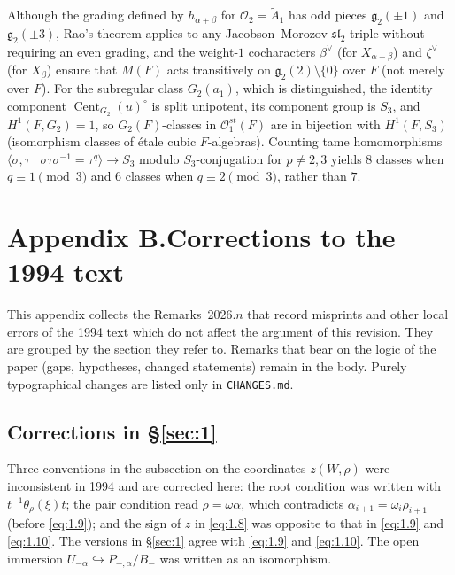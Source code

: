 \documentclass[12pt,letterpaper]{amsart}
\makeatletter
\theoremstyle{plain}
\theoremstyle{definition}
\newcommand{\fixedlabel}[1]{\phantomsection\def\@currentlabel{#1}}
\theoremstyle{remark}
\theoremstyle{definition}
\newcommand{\ovF}{\overline{F}}
\DeclareMathOperator{\Cent}{Cent}
\makeatother
\begin{document}
\begin{rem26}\label{rem:A7}
Although the grading defined by $h_{\alpha+\beta}$ for $\mathcal O_2=\tilde A_1$
has odd pieces $\mathfrak g_2(\pm1)$ and $\mathfrak g_2(\pm3)$, Rao's theorem
\cite[pp.~506--507]{Ra72} applies to any Jacobson--Morozov $\mathfrak{sl}_2$-triple
without requiring an even grading, and the weight-$1$ cocharacters $\beta^\vee$
(for $X_{\alpha+\beta}$) and $\zeta^\vee$ (for $X_\beta$) ensure that $M(F)$
acts transitively on $\mathfrak g_2(2)\setminus\{0\}$ over $F$ (not merely over
$\ovF$). For the subregular class $G_2(a_1)$, which is distinguished, the
identity component $\Cent_{G_2}(u)^\circ$ is split unipotent, its component
group is $S_3$, and $H^1(F,G_2)=1$, so $G_2(F)$-classes in $\mathcal O_1^{st}(F)$
are in bijection with $H^1(F,S_3)$ (isomorphism classes of \'etale cubic
$F$-algebras). Counting tame homomorphisms
$\langle\sigma,\tau\mid\sigma\tau\sigma^{-1}=\tau^q\rangle\to S_3$ modulo
$S_3$-conjugation for $p\neq2,3$ yields $8$ classes when $q\equiv1\pmod 3$ and
$6$ classes when $q\equiv2\pmod3$, rather than $7$.
\end{rem26}

\section*{\texorpdfstring{Appendix B.\quad Corrections to the 1994 text}{Appendix B. Corrections to the 1994 text}}\fixedlabel{B}\label{sec:B}

This appendix collects the Remarks~2026.$n$ that record misprints and other
local errors of the 1994 text which do not affect the argument of this
revision. They are grouped by the section they refer to. Remarks that bear on
the logic of the paper (gaps, hypotheses, changed statements) remain in the
body. Purely typographical changes are listed only in \texttt{CHANGES.md}.

\subsection*{Corrections in \S\ref{sec:1}}

\begin{rem26}\label{rem:conventions}
Three conventions in the subsection on the coordinates $z(W,\rho)$ were inconsistent in 1994 and are
corrected here: the root condition was written with $t^{-1}\theta_\rho(\xi)t$;
the pair condition read $\rho=\omega\alpha$, which contradicts
$\alpha_{i+1}=\omega_i\rho_{i+1}$ (before \eqref{eq:1.9}); and the sign of $z$ in \eqref{eq:1.8}
was opposite to that in \eqref{eq:1.9} and \eqref{eq:1.10}. The versions in \S\ref{sec:1} agree with \eqref{eq:1.9} and \eqref{eq:1.10}. The open immersion
$U_{-\alpha}\hookrightarrow P_{-,\alpha}/B_-$ was written as an isomorphism.
\end{rem26}
\end{document}
